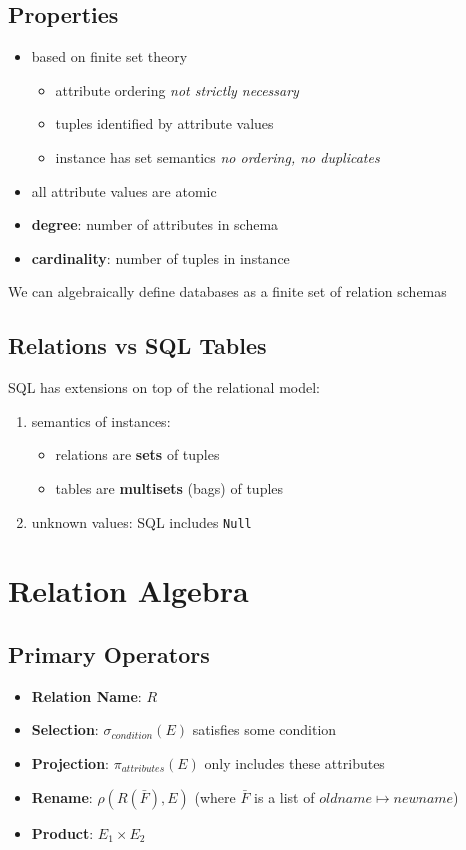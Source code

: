 \documentclass[]{article}
\theoremstyle{definition}
\begin{document}
		\subsection{Properties}
			\begin{itemize}
				\item based on finite set theory
					\begin{itemize}
						\item attribute ordering \textit{not strictly necessary}
						\item tuples identified by attribute values
						\item instance has set semantics \textit{no ordering, no duplicates}
					\end{itemize}
				\item all attribute values are atomic 
				\item \textbf{degree}: number of attributes in schema
				\item \textbf{cardinality}: number of tuples in instance
			\end{itemize}			 			
				
			We can algebraically define databases as a finite set of relation schemas
		\subsection{Relations vs SQL Tables}
			SQL has extensions on top of the relational model:
			\begin{enumerate}
				\item semantics of instances:
					\begin{itemize}
						\item relations are \textbf{sets} of tuples
						\item tables are \textbf{multisets} (bags) of tuples 
					\end{itemize}
				\item unknown values: SQL includes \lstinline|Null|
			\end{enumerate}
	\section{Relation Algebra}
		\subsection{Primary Operators}
			\begin{itemize}
				\item \textbf{Relation Name}: $R$
				\item \textbf{Selection}: $\sigma_{condition}(E)$ satisfies some condition
				\item \textbf{Projection}: $\pi_{attributes}(E)$ only includes these attributes
				\item \textbf{Rename}: $\rho(R(\bar{F}),E)$ (where $\bar{F}$ is a list of $oldname \mapsto newname$)
				\item \textbf{Product}: $E_1 \times E_2$
			\end{itemize}	
\end{document}
